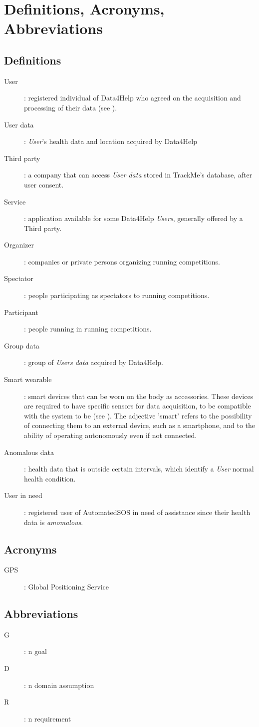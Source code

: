 \documentclass[../../rasd.tex]{subfiles}
\begin{document}
\section{Definitions, Acronyms, Abbreviations}
		\subsection{Definitions}
		\begin{description}
			\item[User]: registered individual of Data4Help who agreed on the acquisition and processing of their data (see ).
			\item[User data]: \textit{User}'s health data and location acquired by Data4Help
			\item[Third party]: a company that can access \textit{User data} stored in TrackMe's database, after user consent.
			\item[Service]: application available for some Data4Help \textit{Users}, generally offered by a Third party.
			\item[Organizer]: companies or private persons organizing running competitions.
			\item[Spectator]: people participating as spectators to running competitions.
			\item[Participant]: people running in running competitions.
			\item[Group data]: group of \textit{Users data} acquired by Data4Help.
			\item[Smart wearable]: smart devices that can be worn on the body as accessories. These devices are required to have specific sensors for data acquisition, to be compatible with the system to be (see ). The adjective 'smart' refers to the possibility of connecting them to an external device, such as a smartphone, and to the ability of operating autonomously even if not connected.
			\item[Anomalous data]: health data that is outside certain intervals, which identify a \textit{User} normal health condition. 
			\item[User in need]: registered user of AutomatedSOS in need of assistance since their health data is \textit{amomalous}.

		\end{description}
		\subsection{Acronyms}
		\begin{description}
		\item[GPS]: Global Positioning Service
		\end{description}
		\subsection{Abbreviations}
		\begin{description}
			\item[G]: n goal
			\item[D]: n domain assumption
			\item[R]: n requirement
			
		\end{description}
		
\end{document}

